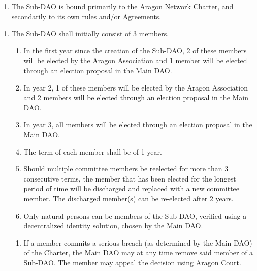 
\label{chap:SubDAOAgreements}

\begin{enumerate}
	
	\begin{enumerate}
		\begin{enumerate}
			\item The Sub-\ac{DAO} is bound primarily to the Aragon Network Charter, and secondarily to its own rules and/or Agreements.
		\end{enumerate}
		
		\begin{enumerate}
			\item The Sub-\ac{DAO} shall initially consist of 3 members.
			\begin{enumerate}
				\item In the first year since the creation of the Sub-\ac{DAO}, 2 of these
				members will be elected by the Aragon Association and 1 member
				will be elected through an election proposal in the Main \ac{DAO}.
				\item In year 2, 1 of these members will be elected by the Aragon
				Association and 2 members will be elected through an election
				proposal in the Main \ac{DAO}.
				\item In year 3, all members will be elected through an election proposal
				in the Main \ac{DAO}.
				\item The term of each member shall be of 1 year.
				\item Should multiple committee members be reelected for more than 3
				consecutive terms, the member that has been elected for the longest period of time will be discharged and replaced with a new committee member. The discharged member(s) can be re-elected after 2 years.
				\item Only natural persons can be members of the Sub-\ac{DAO}, verified using a decentralized identity solution, chosen by the Main \ac{DAO}.
			\end{enumerate}
			\begin{enumerate}
				\item If a member commits a serious breach (as determined by the Main \ac{DAO}) of the Charter, the Main \ac{DAO} may at any time remove said member of a Sub-\ac{DAO}. The member may appeal the decision using Aragon Court.

\end{enumerate}
\end{enumerate}
\end{enumerate}
\end{enumerate}
